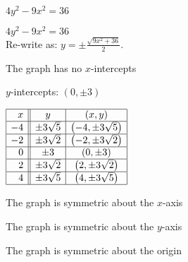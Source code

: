 {$4y^2 - 9x^2 = 36$}
{$4y^2-9x^2 = 36$ \\

Re-write as: $y = \pm \frac{\sqrt{9x^2+36}}{2}$.

The graph has no $x$-intercepts \smallskip

$y$-intercepts:  $(0, \pm 3)$ \smallskip

$\begin{array}{|r||c|c|} 

\hline
 x &   y & (x,y) \\ \hline
-4 & \pm 3 \sqrt{5} &  \left(-4,\pm 3 \sqrt{5}\right) \\  \hline
-2 & \pm 3 \sqrt{2} & \left(-2,\pm 3 \sqrt{2}\right) \\ \hline
0 &  \pm 3 & (0, \pm 3) \\ \hline
2 & \pm 3 \sqrt{2} & \left(2,\pm 3 \sqrt{2}\right) \\ \hline
4 & \pm 3 \sqrt{5} &  \left(4,\pm 3 \sqrt{5}\right) \\  \hline
 
 
\end{array}$ \smallskip



\smallskip

The graph is symmetric about the $x$-axis \smallskip

The graph is symmetric about the $y$-axis \smallskip

The graph is symmetric about the origin}